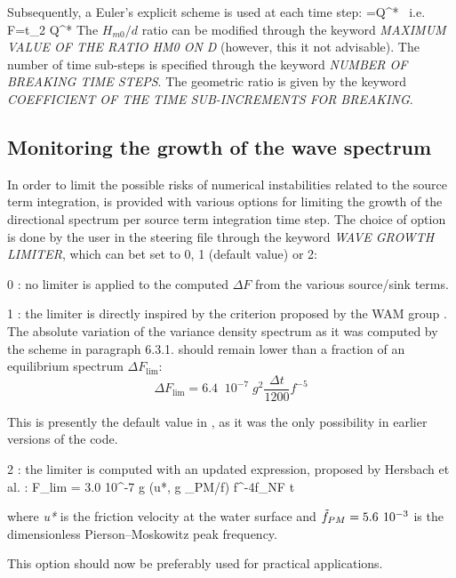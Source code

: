  Subsequently, a Euler's explicit scheme is used at each time step:
\bequ \label{eq:eulerexpli}
 =Q^* \mbox{ i.e. } \Delta F=\Delta t_{2} Q^*
\eequ
 The $H_{m0}/d$ ratio can be modified through the keyword \textit{MAXIMUM VALUE OF THE RATIO HM0 ON D} (however, this it not advisable). The number of time sub-steps is specified through the keyword \textit{NUMBER OF BREAKING TIME STEPS}. The geometric ratio is given by the keyword \textit{COEFFICIENT OF THE TIME SUB-INCREMENTS FOR BREAKING}.


\subsection{ Monitoring the growth of the wave spectrum }
\label{se:growthlimiter}
 In order to limit the possible risks of numerical instabilities related to the source term integration, \tomawac is provided with various options for limiting the growth of the directional spectrum per source term integration time step. The choice of option is done by the user in the steering file through the keyword\textit{ WAVE GROWTH LIMITER}, which can bet set to 0, 1 (default value) or 2:

 0 : no limiter is applied to the computed $\Delta F$ from the various source/sink terms.

 1 : the limiter is directly inspired by the criterion proposed by the WAM group \cite{Wamdi1988}. The absolute variation of the variance density spectrum as it was computed by the scheme in paragraph 6.3.1. should remain lower than a fraction of an equilibrium spectrum $\Delta F_{\lim }$:
\begin{equation} \label{GrindEQ__6_24_}
\Delta F_{\lim } =6.4\; \; 10^{-7} \; g^{2} \frac{\Delta t}{1200} f^{-5}
\end{equation}

 This is presently the default value in \tomawac, as it was the only possibility in earlier versions of the code.

 2 : the limiter is computed with an updated expression, proposed by Hersbach et al. \cite{Hersbach1999}:
\bequ
\Delta F_{lim} = 3.0 10^{-7} g \max(u*, g _{PM}/f) f^{-4}f_{NF} \Delta t
\eequ

 where \textit{u*} is the friction velocity at the water surface and $\tilde{f}_{PM} =5.6{\kern 1pt} \; 10^{-3} $ is the dimensionless Pierson--Moskowitz peak frequency.

 This option should now be preferably used for practical applications.


